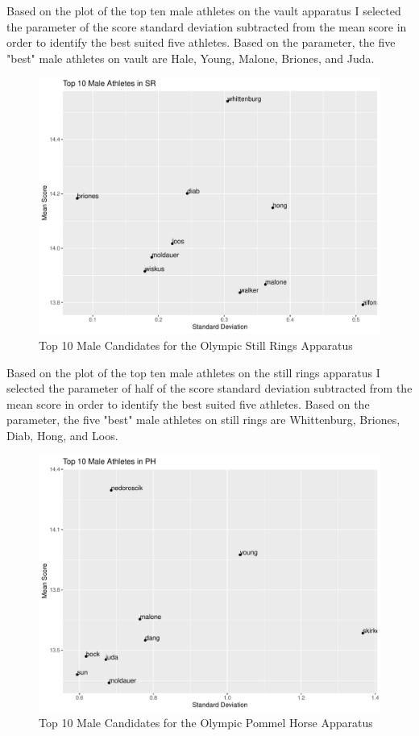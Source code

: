 \documentclass[12pt]{article}
\begin{document}
  Based on the plot of the top ten male athletes on the vault apparatus I selected the parameter of 
  the score standard deviation subtracted from the mean score in order to identify the best suited five 
  athletes. Based on the parameter, the five "best" male athletes on vault are Hale, Young, Malone, Briones, and 
  Juda.

\begin{figure}
    \centering
    \includegraphics[scale=0.6]{MaleAthletesSR.pdf}
    \caption{Top 10 Male Candidates for the Olympic Still Rings Apparatus}
    \label{fig:SRM}
  \end{figure}

  Based on the plot of the top ten male athletes on the still rings apparatus I selected the parameter of 
  half of the score standard deviation subtracted from the mean score in order to identify the best suited five 
  athletes. Based on the parameter, the five "best" male athletes on still rings are Whittenburg, Briones, Diab, 
  Hong, and Loos.

\begin{figure}
    \centering
    \includegraphics[scale=0.6]{MaleAthletesPH.pdf}
    \caption{Top 10 Male Candidates for the Olympic Pommel Horse Apparatus}
    \label{fig:PHM}
  \end{figure}
\end{document}
